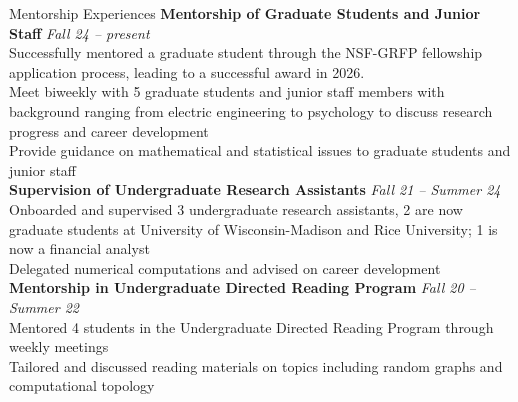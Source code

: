 \documentclass{resume} %
\begin{document}
\begin{rSection}{Mentorship Experiences}
\textbf{Mentorship of Graduate Students and Junior Staff} \hfill {\em Fall 24 -- present}\\
Successfully mentored a graduate student through the NSF-GRFP fellowship application process, leading to a successful award in 2026.\\
Meet biweekly with 5 graduate students and junior staff members with background ranging from electric engineering to psychology to discuss research progress and career development\\ %
Provide guidance on mathematical and statistical issues to graduate students and junior staff\\
\textbf{Supervision of Undergraduate Research Assistants} \hfill {\em Fall 21 -- Summer 24}\\
Onboarded and supervised 3 undergraduate research assistants, 2 are now graduate students at University of Wisconsin-Madison and Rice University; 1 is now a financial analyst\\
Delegated numerical computations and advised on career development\\
\textbf{Mentorship in Undergraduate Directed Reading Program} \hfill {\em Fall 20 -- Summer 22}\\
Mentored 4 students in the Undergraduate Directed Reading Program through weekly meetings\\
Tailored and discussed reading materials on topics including random graphs and computational topology

\end{rSection}
\end{document}
